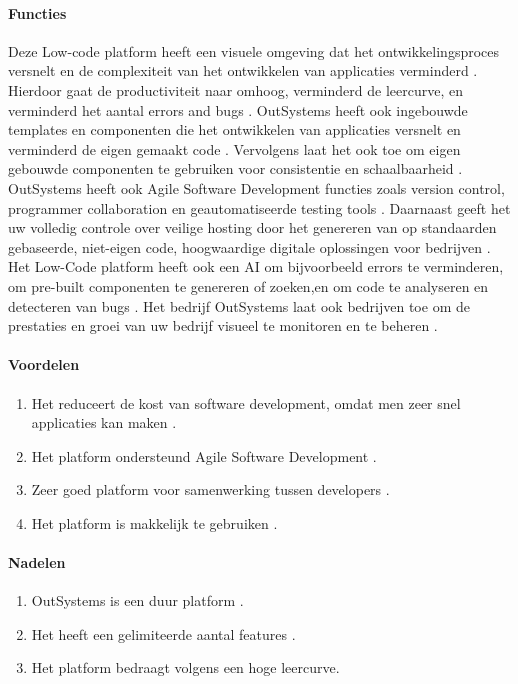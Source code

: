 \paragraph{Functies}
Deze Low-code platform heeft een visuele omgeving dat het ontwikkelingsproces versnelt en de complexiteit van het ontwikkelen van applicaties verminderd \autocite{Payne2023}.
Hierdoor gaat de productiviteit naar omhoog, verminderd de leercurve, en verminderd het aantal errors and bugs \autocite{Payne2023}. OutSystems heeft ook ingebouwde templates 
en componenten die het ontwikkelen van applicaties versnelt en verminderd de eigen gemaakt code \autocite{Payne2023}.
Vervolgens laat het ook toe om eigen gebouwde componenten te gebruiken voor consistentie en schaalbaarheid \autocite{Ranosys2023}.
OutSystems heeft ook Agile Software Development functies zoals version control, programmer collaboration en geautomatiseerde testing tools \autocite{Ranosys2023}.
Daarnaast geeft het uw volledig controle over veilige hosting door het genereren van op standaarden gebaseerde, niet-eigen code, hoogwaardige digitale oplossingen voor bedrijven \autocite{Ranosys2023}.
Het Low-Code platform heeft ook een AI om bijvoorbeeld errors te verminderen, om pre-built componenten te genereren of zoeken,en om code te analyseren en detecteren van bugs \autocite{Ranosys2023}.
Het bedrijf OutSystems laat ook bedrijven toe om de prestaties en groei van uw bedrijf visueel te monitoren en te beheren \autocite{Ranosys2023}.

\paragraph*{Voordelen}
\begin{enumerate}
    \item Het reduceert de kost van software development, omdat men zeer snel applicaties kan maken \autocite{Payne2023}.
    \item Het platform ondersteund Agile Software Development \autocite{Payne2023}.
    \item Zeer goed platform voor samenwerking tussen developers \autocite{Payne2023}.
    \item Het platform is makkelijk te gebruiken \autocite{G22024OutSystems}.
\end{enumerate}


\paragraph*{Nadelen}
\begin{enumerate}
    \item OutSystems is een duur platform \autocite{G22024OutSystems}.
    \item Het heeft een gelimiteerde aantal features \autocite{G22024OutSystems}.
    \item Het platform bedraagt volgens \textcite{G22024OutSystems} een hoge leercurve.
\end{enumerate}

